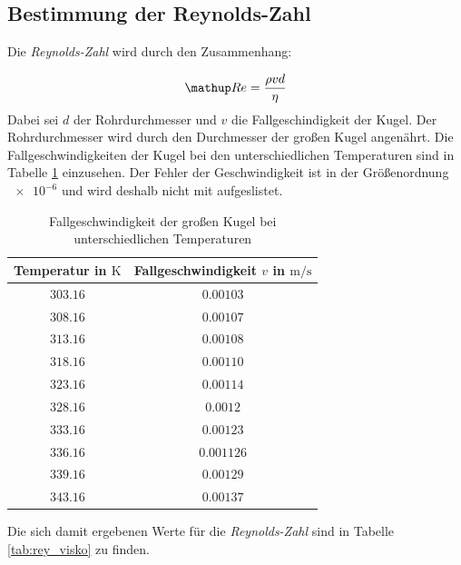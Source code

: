 \subsection{Bestimmung der Reynolds-Zahl}

Die \emph{Reynolds-Zahl} wird durch den Zusammenhang:

\begin{equation*}
\map{Re}=\frac{\rho v d}{\eta}
\end{equation*}
Dabei sei $d$ der Rohrdurchmesser und $v$ die Fallgeschindigkeit der Kugel.
Der Rohrdurchmesser wird durch den Durchmesser der großen Kugel angenährt.
Die Fallgeschwindigkeiten der Kugel bei den unterschiedlichen Temperaturen sind in Tabelle \ref{tab:fall_kugel} einzusehen.
Der Fehler der Geschwindigkeit ist in der Größenordnung $\num{e-6}$ und wird deshalb nicht mit aufgeslistet.

\begin{table}
\centering
\begin{tabular} {cc}
  \toprule
  Temperatur in $\si{\kelvin}$ & Fallgeschwindigkeit $v$ in $\si{\meter\per\second}$ \\
  \midrule 
  $\num{303.16}$ & $\num{0.00103}$ \\
  $\num{308.16}$ & $\num{0.00107}$ \\
  $\num{313.16}$ & $\num{0.00108}$ \\ 
  $\num{318.16}$ & $\num{0.00110}$ \\
  $\num{323.16}$ & $\num{0.00114}$ \\ 
  $\num{328.16}$ & $\num{0.0012}$ \\ 
  $\num{333.16}$ & $\num{0.00123}$ \\ 
  $\num{336.16}$ & $\num{0.001126}$ \\
  $\num{339.16}$ & $\num{0.00129}$ \\
  $\num{343.16}$ & $\num{0.00137}$ \\
\bottomrule
\end{tabular}
\caption{Fallgeschwindigkeit der großen Kugel bei unterschiedlichen Temperaturen}
\label{tab:fall_kugel}
\end{table}

Die sich damit ergebenen Werte für die \emph{Reynolds-Zahl} sind in Tabelle \ref{tab:rey_visko} 
zu finden.

